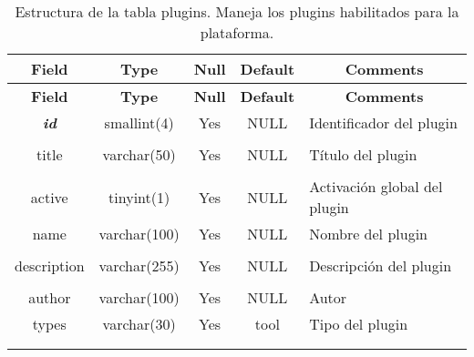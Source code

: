 %
%
\begin{longtable}{c c c c l}
	\multicolumn{1}{c}{\textbf{Field}} &
	\multicolumn{1}{c}{\textbf{Type}} &
	\multicolumn{1}{c}{\textbf{Null}} &
	\multicolumn{1}{c}{\textbf{Default}} &
	\multicolumn{1}{c}{\textbf{Comments}} \\ \hline \hline
\endfirsthead
	\multicolumn{1}{c}{\textbf{Field}} &
	\multicolumn{1}{c}{\textbf{Type}} &
	\multicolumn{1}{c}{\textbf{Null}} &
	\multicolumn{1}{c}{\textbf{Default}} &
	\multicolumn{1}{c}{\textbf{Comments}} \\ \hline \hline
\endhead \endfoot
	\textbf{\textit{id}} & smallint(4)  & Yes & NULL & \parbox[t]{0.35\textwidth}{Identificador del plugin} \\ \\  \hline
	title & varchar(50) & Yes & NULL & \parbox[t]{0.35\textwidth}{Título del plugin} \\ \\  \hline
	active & tinyint(1) & Yes & NULL & \parbox[t]{0.35\textwidth}{Activación global del plugin} \\ \hline 
	name & varchar(100) & Yes & NULL & \parbox[t]{0.35\textwidth}{Nombre del plugin} \\ \\  \hline
	description & varchar(255) & Yes & NULL & \parbox[t]{0.35\textwidth}{Descripción del plugin} \\ \\  \hline
	author & varchar(100) & Yes & NULL & \parbox[t]{0.35\textwidth}{Autor} \\ \hline 
	types & varchar(30) & Yes & tool & \parbox[t]{0.35\textwidth}{Tipo del plugin} \\ \\  \hline
\caption[Estructura de la tabla plugins]{Estructura de la tabla plugins. Maneja los plugins habilitados para la plataforma.} \label{tab:plugins-structure} \\
\end{longtable}

